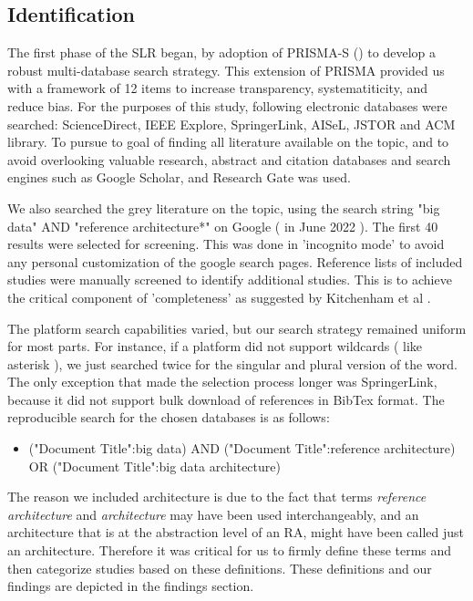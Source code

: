\documentclass[review]{elsarticle}
\begin{document}
\subsection{Identification}

The first phase of the SLR began, by adoption of PRISMA-S (\cite{rethlefsen2021prisma}) to develop a robust multi-database search strategy. This extension of PRISMA provided us with a framework of 12 items to increase transparency, systematiticity, and reduce bias. For the purposes of this study, following electronic databases were searched: ScienceDirect, IEEE Explore, SpringerLink, AISeL, JSTOR and ACM library. To pursue to goal of finding all literature available on the topic, and to avoid overlooking valuable research, abstract and citation databases and search engines such as Google Scholar, and Research Gate was used.

We also searched the grey literature on the topic, using the search string "big data" AND "reference architecture*" on Google ( in June 2022 ). The first 40 results were selected for screening. This was done in 'incognito mode' to avoid any personal customization of the google search pages. Reference lists of included studies were manually screened to identify additional studies. This is to achieve the critical component of 'completeness' as suggested by Kitchenham et al \cite{kitchenham2015evidence}.

The platform search capabilities varied, but our search strategy remained uniform for most parts. For instance, if a platform did not support wildcards ( like asterisk ), we just searched twice for the singular and plural version of the word. The only exception that made the selection process longer was SpringerLink, because it did not support bulk download of references in BibTex format. The reproducible search for the chosen databases is as follows: 

\begin{itemize}
    \item ("Document Title":big data) AND ("Document Title":reference architecture) OR ("Document Title":big data architecture)
\end{itemize}

The reason we included architecture is due to the fact that terms \emph{reference architecture} and \emph{architecture} may have been used interchangeably, and an architecture that is at the abstraction level of an RA, might have been called just an architecture. Therefore it was critical for us to firmly define these terms and then categorize studies based on these definitions. These definitions and our findings are depicted in the findings section.
\end{document}
